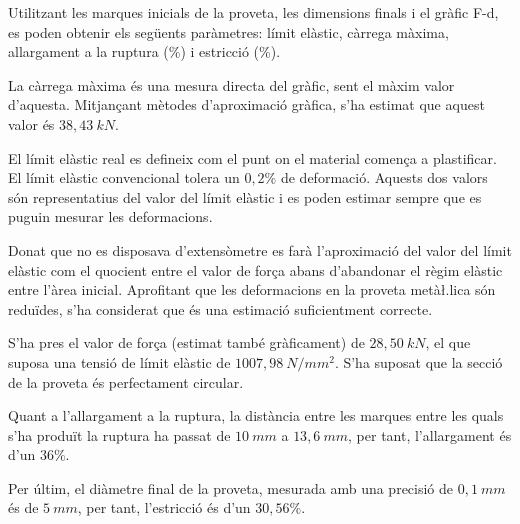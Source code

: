 \documentclass[a4paper]{report}
\begin{document}
Utilitzant les marques inicials de la proveta, les dimensions finals i el gràfic F-d, es poden obtenir els següents paràmetres: límit elàstic, càrrega màxima, allargament a la ruptura (\%) i estricció (\%).

La càrrega màxima és una mesura directa del gràfic, sent el màxim valor d’aquesta. Mitjançant mètodes d’aproximació gràfica, s’ha estimat que aquest valor és $38,43 \ kN$.

El límit elàstic real es defineix com el punt on el material comença a plastificar. El límit elàstic convencional tolera un $0,2\%$ de deformació. Aquests dos valors són representatius del valor del límit elàstic i es poden estimar sempre que es puguin mesurar les deformacions. 

Donat que no es disposava d’extensòmetre es farà l’aproximació del valor del límit elàstic com el quocient entre el valor de força abans d’abandonar el règim elàstic entre l’àrea inicial. Aprofitant que les deformacions en la proveta metà\l.lica són reduïdes, s’ha considerat que és una estimació suficientment correcte.

S’ha pres el valor de força (estimat també gràficament) de $28,50 \ kN$, el que suposa una tensió de límit elàstic de $1007,98 \ N/mm^2$. S’ha suposat que la secció de la proveta és perfectament circular.

Quant a l’allargament a la ruptura, la distància entre les marques entre les quals s’ha produït la ruptura ha passat de $10 \ mm$ a $13,6 \ mm$, per tant, l’allargament és d’un $36\%$.

Per últim, el diàmetre final de la proveta, mesurada amb una precisió de $0,1 \ mm$ és de $5 \ mm$, per tant, l’estricció és d’un $30,56\%$.
\end{document}
